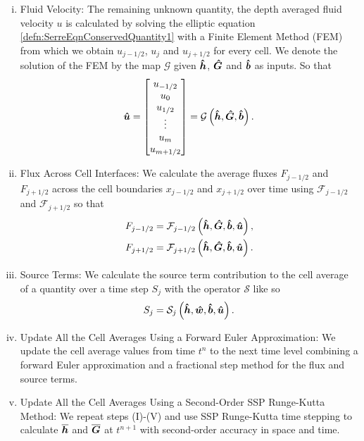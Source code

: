 \begin{enumerate}[(i)]
	\item Fluid Velocity: The remaining unknown quantity, the depth averaged fluid velocity $u$ is calculated by solving the elliptic equation \eqref{defn:SerreEqnConservedQuantity1} with a Finite Element Method (FEM) from which we obtain $u_{j-1/2}$, $u_j$ and $u_{j+1/2}$ for every cell. We denote the solution of the FEM by the map $\mathcal{G}$ given  $\boldsymbol{\hat{h}}$, $\boldsymbol{\hat{G}}$ and $\boldsymbol{\hat{b}}$ as inputs. So that
	\begin{equation*}
	\boldsymbol{\hat{u}} = 
	\begin{bmatrix}
	u_{-1/2} \\ u_0 \\ u_{1/2} \\ \vdots \\ u_m \\ u_{m+1/2}
	\end{bmatrix} = \mathcal{G}\left( \boldsymbol{\hat{h}}, \boldsymbol{\hat{G}},\boldsymbol{\hat{b}} \right).
	\end{equation*}
	\item Flux Across Cell Interfaces: We calculate the average fluxes $F_{j-1/2}$ and $F_{j+1/2}$ across the cell boundaries $x_{j-1/2}$ and $x_{j+1/2}$ over time using $\mathcal{F}_{j-1/2}$ and $\mathcal{F}_{j+1/2}$ so that
		\begin{align*}	
		F_{j-1/2} &=\mathcal{F}_{j-1/2} \left( \boldsymbol{\hat{h}}, \boldsymbol{\hat{G}},\boldsymbol{\hat{b}}, \boldsymbol{\hat{u}}  \right),\\
		F_{j+1/2} &=\mathcal{F}_{j+1/2} \left(\boldsymbol{\hat{h}}, \boldsymbol{\hat{G}},\boldsymbol{\hat{b}}, \boldsymbol{\hat{u}}  \right).
		\end{align*}
	\item Source Terms: We calculate the source term contribution to the cell average of a quantity over a time step $S_{j}$ with the operator $\mathcal{S}$ like so
	\begin{equation*}	
	S_{j} =\mathcal{S}_{j} \left( \boldsymbol{\hat{h}},\boldsymbol{\hat{w}},\boldsymbol{\hat{b}}, \boldsymbol{\hat{u}}  \right).
	\end{equation*}
	\item Update All the Cell Averages Using a Forward Euler Approximation: We update the cell average values from time $t^n$ to the next time level combining a forward Euler approximation and a fractional step method for the flux and source terms.
	\item Update All the Cell Averages Using a Second-Order SSP Runge-Kutta Method: We repeat steps (I)-(V) and use SSP Runge-Kutta time stepping to calculate $\overline{\boldsymbol{h}}$ and $\overline{\boldsymbol{G}}$ at $t^{n+1}$ with second-order accuracy in space and time.
\end{enumerate}

